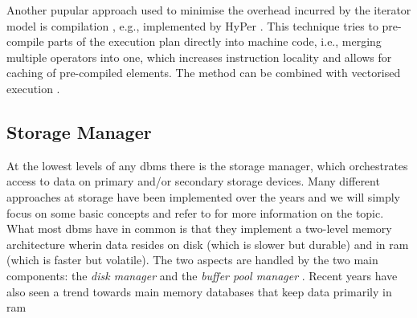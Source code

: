 Another pupular approach used to minimise the overhead incurred by the iterator model is compilation \cite{Krolik:2021r3d3,Funke:2021Low}, e.g., implemented by HyPer \cite{Neumann:2014Compiling}. This technique tries to pre-compile parts of the execution plan directly into machine code, i.e., merging multiple operators into one, which increases instruction locality and allows for caching of pre-compiled elements. The method can be combined with vectorised execution \cite{Sompolski:2011Vectorization,Rosenfeld:2022Query}.

\subsection{Storage Manager}
\label{section:databases_storage_manager}
At the lowest levels of any \acrshort{dbms} there is the storage manager, which orchestrates access to data on primary and/or secondary storage devices. Many different approaches at storage have been implemented over the years and we will simply focus on some basic concepts and refer to \cite{Petrov:2019Database} for more information on the topic. What most \acrshort{dbms} have in common is that they implement a two-level memory architecture wherin data resides on disk (which is slower but durable) and in \acrfull{ram} (which is faster but volatile). The two aspects are handled by the two main components: the \emph{disk manager} and the \emph{buffer pool manager} \cite{Petrov:2019Database}. Recent years have also seen a trend towards main memory databases that keep data primarily in \acrshort{ram} \cite{Garcia:1992Main,Faerber:2017Main}

